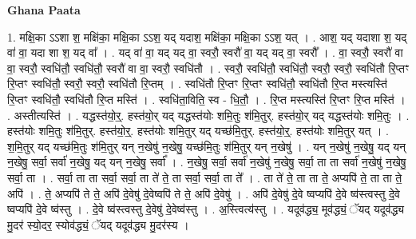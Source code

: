 \documentclass[17pt]{extarticle}
\begin{document}
\textbf{Ghana Paata } \newline

1. मक्षि॒का ऽऽशा श॒ मक्षि॑का॒ मक्षि॒का ऽऽश॒ यद् यदाश॒ मक्षि॑का॒ मक्षि॒का ऽऽश॒ यत् । . आश॒ यद् यदाशा श॒ यद् वा॑ वा॒ यदा शा श॒ यद् वा᳚ । . यद् वा॑ वा॒ यद् यद् वा॒ स्वरौ॒ स्वरौ॑ वा॒ यद् यद् वा॒ स्वरौ᳚ । . वा॒ स्वरौ॒ स्वरौ॑ वा वा॒ स्वरौ॒ स्वधि॑तौ॒ स्वधि॑तौ॒ स्वरौ॑ वा वा॒ स्वरौ॒ स्वधि॑तौ । . स्वरौ॒ स्वधि॑तौ॒ स्वधि॑तौ॒ स्वरौ॒ स्वरौ॒ स्वधि॑तौ रि॒प्तꣳ रि॒प्तꣳ स्वधि॑तौ॒ स्वरौ॒ स्वरौ॒ स्वधि॑तौ रि॒प्तम् । . स्वधि॑तौ रि॒प्तꣳ रि॒प्तꣳ स्वधि॑तौ॒ स्वधि॑तौ रि॒प्त मस्त्यस्ति॑ रि॒प्तꣳ स्वधि॑तौ॒ स्वधि॑तौ रि॒प्त मस्ति॑ । . स्वधि॑ता॒विति॒ स्व - धि॒तौ॒ । . रि॒प्त मस्त्यस्ति॑ रि॒प्तꣳ रि॒प्त मस्ति॑ । . अस्तीत्यस्ति॑ । . यद्धस्त॑यो॒र्॒. हस्त॑यो॒र् यद् यद्धस्त॑योः शमि॒तुः श॑मि॒तुर्. हस्त॑यो॒र् यद् यद्धस्त॑योः शमि॒तुः । . हस्त॑योः शमि॒तुः श॑मि॒तुर्. हस्त॑यो॒र्॒. हस्त॑योः शमि॒तुर् यद् यच्छ॑मि॒तुर्. हस्त॑यो॒र्॒. हस्त॑योः शमि॒तुर् यत् । . श॒मि॒तुर् यद् यच्छ॑मि॒तुः श॑मि॒तुर् यन् न॒खेषु॑ न॒खेषु॒ यच्छ॑मि॒तुः श॑मि॒तुर् यन् न॒खेषु॑ । . यन् न॒खेषु॑ न॒खेषु॒ यद् यन् न॒खेषु॒ सर्वा॒ सर्वा॑ न॒खेषु॒ यद् यन् न॒खेषु॒ सर्वा᳚ । . न॒खेषु॒ सर्वा॒ सर्वा॑ न॒खेषु॑ न॒खेषु॒ सर्वा॒ ता ता सर्वा॑ न॒खेषु॑ न॒खेषु॒ सर्वा॒ ता । . सर्वा॒ ता ता सर्वा॒ सर्वा॒ ता ते॑ ते॒ ता सर्वा॒ सर्वा॒ ता ते᳚ । . ता ते॑ ते॒ ता ता ते॒ अप्यपि॑ ते॒ ता ता ते॒ अपि॑ । . ते॒ अप्यपि॑ ते ते॒ अपि॑ दे॒वेषु॑ दे॒वेष्वपि॑ ते ते॒ अपि॑ दे॒वेषु॑ । . अपि॑ दे॒वेषु॑ दे॒वे ष्वप्यपि॑ दे॒वे ष्व॑स्त्वस्तु दे॒वे ष्वप्यपि॑ दे॒वे ष्व॑स्तु । . दे॒वे ष्व॑स्त्वस्तु दे॒वेषु॑ दे॒वेष्व॑स्तु । . अ॒स्त्वित्य॑स्तु । . यदूव॑द्ध्य॒ मूव॑द्ध्यं॒ ॅयद् यदूव॑द्ध्य मु॒दर॑ स्यो॒दर॒ स्योव॑द्ध्यं॒ ॅयद् यदूव॑द्ध्य मु॒दर॑स्य । \newline
\end{document}
